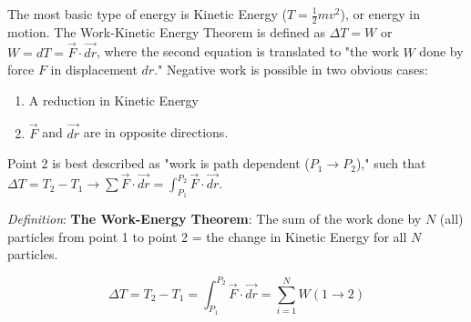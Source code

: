 
The most basic type of energy is Kinetic Energy ($T = \frac{1}{2}mv^2$), or energy in motion. The Work-Kinetic Energy Theorem is defined as $\Delta T = W$ or $W = dT = \vec{F} \cdot \vec{dr}$, where the second equation is translated to "the work $W$ done by force $F$ in displacement $dr$." Negative work is possible in two obvious cases:

\begin{enumerate}
    \item A reduction in Kinetic Energy
    \item $\vec{F}$ and $\vec{dr}$ are in opposite directions.
\end{enumerate}

Point 2 is best described as "work is path dependent ($P_1 \rightarrow P_2$)," such that $\Delta T = T_2 - T_1 \rightarrow \sum \vec{F} \cdot \vec{dr} = \int_{P_1}^{P_2} \vec{F} \cdot \vec{dr}$.

{\itshape Definition}: {\bfseries The Work-Energy Theorem}: The sum of the work done by $N$ (all) particles from point 1 to point 2 = the change in Kinetic Energy for all $N$ particles.

\begin{equation*}
    \Delta T = T_2 - T_1 = \int_{P_1}^{P_2} \vec{F} \cdot \vec{dr} = \sum^{N}_{i=1} W(1\rightarrow2)
\end{equation*}

